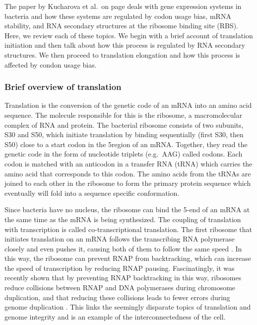 %
The paper by Kucharova et al.\ on page \pageref{vero_paper} deals with gene
expression systems in bacteria and how these systems are regulated by codon
usage bias, mRNA stability, and RNA secondary structures at the ribosome
binding site (RBS). Here, we review each of these topics. We begin with a brief
account of translation initiation and then talk about how this process is
regulated by RNA secondary structures. We then proceed to translation
elongation and how this process is affected by condon usage bias.

\subsubsection{Brief overview of translation}
Translation is the conversion of the genetic code of an mRNA into an amino
acid sequence. The molecule responsible for this is the ribosome, a
macromolecular complex of RNA and protein. The bacterial ribosome consists of
two subunits, S30 and S50, which initiate translation by binding sequentially
(first S30, then S50) close to a start codon in the 5\ppp region of an mRNA.
Together, they read the genetic code in the form of nucleotide triplets (e.g.\
AAG) called codons. Each codon is matched with an anticodon in a transfer RNA
(tRNA) which carries the amino acid that corresponds to this codon. The amino
acids from the tRNAs are joined to each other in the ribosome to form the
primary protein sequence which eventually will fold into a sequence specific
conformation.

Since bacteria have no nucleus, the ribosome can bind the 5\ppp-end of an mRNA
at the same time as the mRNA is being synthesized. The coupling of translation
with transcription is called co-transcriptional translation. The first ribosome
that initiates translation on an mRNA follows the transcribing RNA polymerase
closely and even pushes it, causing both of them to follow the same speed
\cite{proshkin_cooperation_2010}. In this way, the ribosome can prevent RNAP
from backtracking, which can increase the speed of transcription by reducing
RNAP pausing. Fascinatingly, it was recently shown that by preventing RNAP
backtracking in this way, ribosomes reduce collisions between RNAP and DNA
polymerases during chromosome duplication, and that reducing these collisions
leads to fewer errors during genome duplication \cite{dutta_linking_2011}. This
links the seemingly disparate topics of translation and genome integrity and is
an example of the interconnectedness of the cell.

